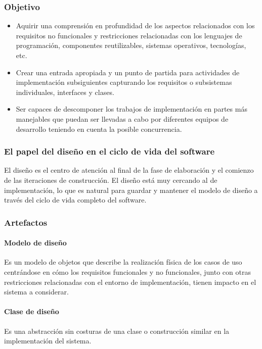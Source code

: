 \subsubsection{Objetivo}
\begin{itemize}
\item Aquirir una comprensión en profundidad de los aspectos relacionados con los requisitos no funcionales y restricciones relacionadas con los lenguajes de programación, componentes reutilizables, sistemas operativos, tecnologías, etc.
\item Crear una entrada apropiada y un punto de partida para actividades de implementación subsiguientes capturando los requisitos o subsistemas individuales, interfaces y clases.
\item Ser capaces de descomponer los trabajos de implementación en partes más manejables que puedan ser llevadas a cabo por diferentes equipos de desarrollo teniendo en cuenta la posible concurrencia.
\end{itemize}
\subsubsection{El papel del diseño en el ciclo de vida del software}
El diseño es el centro de atención al final de la fase de elaboración y el comienzo de las iteraciones de construcción. El diseño está muy cercando al de implementación, lo que es natural para guardar y mantener el modelo de diseño a través del ciclo de vida completo del software.
\subsubsection{Artefactos}
\paragraph{Modelo de diseño}
Es un modelo de objetos que describe la realización física de los casos de uso centrándose en cómo los requisitos funcionales y no funcionales, junto con otras restricciones relacionadas con el entorno de implementación, tienen impacto en el sistema a considerar.
\paragraph{Clase de diseño}
Es una abstracción sin costuras de una clase o construcción similar en la implementación del sistema.
